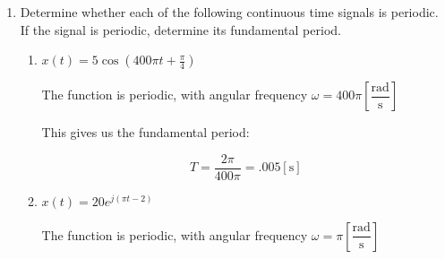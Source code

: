 \begin{enumerate}
\begin{enumerate}
        \begin{center}
          Per trig identities, we can rewrite this as:
        \end{center}
        $$2e^{-2t}\sin\left( 20t+\frac{3\pi}{2}\right) \right)$$
        \begin{center}
          Per another identity, we can convert $\sin\to\cos$:
        \end{center}
        $$2e^{-2t}\cos\left( \frac{\pi}{2}-20t-\frac{3\pi}{2}\right) \right)$$
        $$x_1(t)=2e^{-2t}\cos\left( -20t-\pi\right) \right)$$
        \begin{center}
          Since $\cos(x)=\cos(-x)$, we finally write:
        \end{center}
        $$\boxed{x_1(t)=2e^{-2t}\cos\left( 20t+\pi\right) \right)}$$

      \item $x_2(t)=j(1-j)e^{(-5+j\pi)t}$

        We can rewrite this in terms of exponentials:

        $$x_2(t)=e^{\frac{\pi}{2}j}\left( \sqrt{2}e^{-\frac{\pi}{4}j} \right)\left( e^{(-5+j\pi)t} \right)$$
        $$x_2(t)=\sqrt{2}e^{-5t}\left( e^{j\pi t+\frac{\pi}{2}j-\frac{\pi}{4}j} \right)$$
        $$x_2(t)=\sqrt{2}e^{-5t}\left( e^{j(\pi t+\frac{\pi}{4})} \right)$$
        $$\boxed{x_2(t)=\sqrt{2}e^{-5t}\cos\left(\pi t+\frac{\pi}{4}\right)}$$

    \end{enumerate}

  \item Determine whether each of the following continuous time signals is periodic. If the signal is periodic, determine its fundamental period.

    \begin{enumerate}

      \item $x(t)=5\cos\left( 400\pi t+\frac{\pi}{4} \right)$

        The function is periodic, with angular frequency $\omega=400\pi\left[ \dfrac{\text{rad}}{\si{\second}} \right]$

        This gives us the fundamental period:

        $$\boxed{T=\frac{2\pi}{400\pi}=.005[\si{\second}]}$$

      \item $x(t)=20e^{j(\pi t-2)}$

        The function is periodic, with angular frequency $\omega=\pi\left[ \dfrac{\text{rad}}{\si{\second}} \right]$


\end{enumerate}
\end{enumerate}
